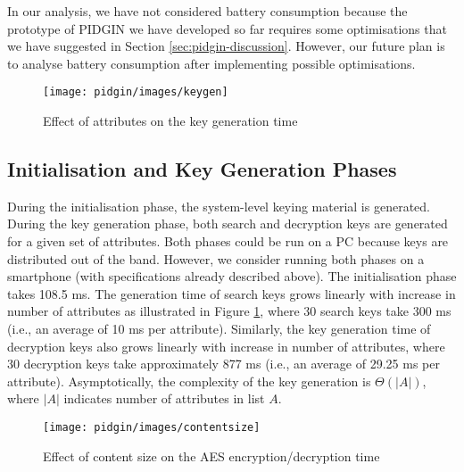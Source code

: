 \documentclass[epsfig,a4paper,11pt,titlepage]{book}
\numberwithin{algorithm}{chapter}
\begin{document}
In our analysis, we have not considered battery consumption because the prototype of \gls{PIDGIN} we have developed so far requires some optimisations that we have suggested in Section \ref{sec:pidgin-discussion}. However, our future plan is to analyse battery consumption after implementing possible optimisations.

\iffalse
Model number GT-I9300
Android version 4.1.2
Baseband version GT-I9300BUELL1
Kernel version 3.0.31-742798
Build number JZO54K.I9300XXELLA
Processor ARMv7
API level 16
CPU ABI: armeabi-v7a
Processor speed is 1.4 GHz
Frequency stats
Max: 1.4 GHz 1.14\%
Min: 200 MHz 87.39\%
Memory RAM 1 GB
\fi

\begin{figure} [htp]
\centering
\texttt{[image: pidgin/images/keygen]} \caption{Effect of attributes on the key generation time}
\label{gra:keygen}
\end{figure}

\subsection{Initialisation and Key Generation Phases}
During the initialisation phase, the system-level keying material is generated. During the key generation phase, both search and decryption keys are generated for a given set of attributes. Both phases could be run on a PC because keys are distributed out of the band. However, we consider running both phases on a smartphone (with specifications already described above). The initialisation phase takes 108.5 \gls{ms}. The generation time of search keys grows linearly with increase in number of attributes as illustrated in Figure \ref{gra:keygen}, where 30 search keys take 300 \gls{ms} (i.e., an average of 10 \gls{ms} per attribute). Similarly, the key generation time of decryption keys also grows linearly with increase in number of attributes, where 30 decryption keys take approximately 877 \gls{ms} (i.e., an average of 29.25 \gls{ms} per attribute). Asymptotically, the complexity of the key generation is ${\Theta}(|A|)$, where $|A|$ indicates number of attributes in list $A$.

\begin{figure} [htp]
\centering
\texttt{[image: pidgin/images/contentsize]} \caption[Effect of content size on the AES encryption/decryption time]{Effect of content size on the \gls{AES} encryption/decryption time}
\label{gra:contentsize}
\end{figure}
\end{document}

